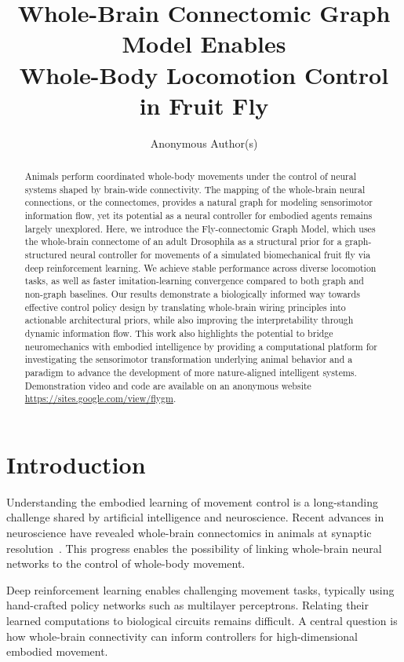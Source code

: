 \documentclass[a4paper]{easychair}
\title{Whole-Brain Connectomic Graph Model Enables\\ Whole-Body Locomotion Control in Fruit Fly}
\author{Anonymous Author(s)}
\institute{Affiliation withheld for review}
\begin{document}
\maketitle

\begin{abstract}
Animals perform coordinated whole-body movements under the control of neural systems shaped by brain-wide connectivity. The mapping of the whole-brain neural connections, or the connectomes, provides a natural graph for modeling sensorimotor information flow, yet its potential as a neural controller for embodied agents remains largely unexplored. Here, we introduce the Fly-connectomic Graph Model, which uses the whole-brain connectome of an adult Drosophila as a structural prior for a graph-structured neural controller for movements of a simulated biomechanical fruit fly via deep reinforcement learning. We achieve stable performance across diverse locomotion tasks, as well as faster imitation-learning convergence compared to both graph and non-graph baselines. Our results demonstrate a biologically informed way towards effective control policy design by translating whole-brain wiring principles into actionable architectural priors, while also improving the interpretability through dynamic information flow. This work also highlights the potential to bridge neuromechanics with embodied intelligence by providing a computational platform for investigating the sensorimotor transformation underlying animal behavior and a paradigm to advance the development of more nature-aligned intelligent systems. Demonstration video and code are available on an anonymous website \url{https://sites.google.com/view/flygm}.
\end{abstract}

\section{Introduction}

Understanding the embodied learning of movement control is a long-standing challenge shared by artificial intelligence and neuroscience. Recent advances in neuroscience have revealed whole-brain connectomics in animals at synaptic resolution~\citep{Dorkenwald2024a}. This progress enables the possibility of linking whole-brain neural networks to the control of whole-body movement.

Deep reinforcement learning enables challenging movement tasks, typically using hand-crafted policy networks such as multilayer perceptrons. Relating their learned computations to biological circuits remains difficult. A central question is how whole-brain connectivity can inform controllers for high-dimensional embodied movement.
\end{document}

